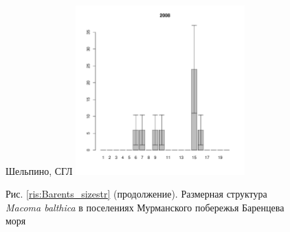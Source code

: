 \begin{figure}[h]
\begin{minipage}[b]{.46\linewidth}
\begin{center}
	\end{center}
	\end{minipage}
	\hfil %
	\begin{minipage}[b]{.46\linewidth}
	\begin{center}
	{\tiny Шельпино, СГЛ}
	\includegraphics[width=65mm]{../Barenc_Sea/Shel'pino/middle_2008_.pdf}
	\end{center}
	\end{minipage}
\begin{center}
Рис. \ref{ris:Barents_sizestr} (продолжение). Размерная структура {\it Macoma balthica} в поселениях Мурманского побережья Баренцева моря
\end{center}
\end{figure}


